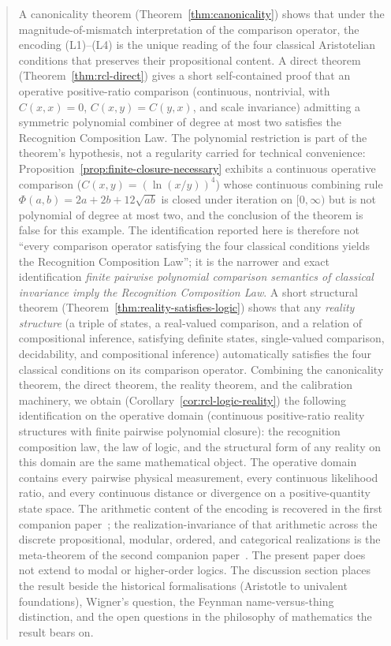 \documentclass[11pt,a4paper]{article}
\theoremstyle{definition}
\theoremstyle{remark}
\begin{document}
\begin{abstract}
A canonicality theorem (Theorem~\ref{thm:canonicality}) shows that
under the magnitude-of-mismatch interpretation of the comparison
operator, the encoding (L1)--(L4) is the unique reading of the four
classical Aristotelian conditions that preserves their propositional
content. A direct theorem
(Theorem~\ref{thm:rcl-direct}) gives a short self-contained proof
that an operative positive-ratio comparison (continuous, nontrivial,
with $C(x,x) = 0$, $C(x,y) = C(y,x)$, and scale invariance) admitting
a symmetric polynomial combiner of degree at most two satisfies the
Recognition Composition Law. The polynomial restriction is part of
the theorem's hypothesis, not a regularity carried for technical
convenience: Proposition~\ref{prop:finite-closure-necessary} exhibits
a continuous operative comparison ($C(x,y) = (\ln(x/y))^4$) whose
continuous combining rule $\Phi(a, b) = 2a + 2b + 12\sqrt{ab}$ is
closed under iteration on $[0, \infty)$ but is not polynomial of
degree at most two, and the conclusion of the theorem is false for
this example. The identification reported here is therefore not
``every comparison operator satisfying the four classical conditions
yields the Recognition Composition Law''; it is the narrower and
exact identification \emph{finite pairwise polynomial comparison
semantics of classical invariance imply the Recognition Composition
Law}. A short structural theorem
(Theorem~\ref{thm:reality-satisfies-logic}) shows that any
\emph{reality structure} (a triple of states, a real-valued
comparison, and a relation of compositional inference, satisfying
definite states, single-valued comparison, decidability, and
compositional inference) automatically satisfies the four classical
conditions on its comparison operator. Combining the canonicality
theorem, the direct theorem, the reality theorem, and the calibration
machinery, we obtain
(Corollary~\ref{cor:rcl-logic-reality}) the following identification
on the operative domain (continuous positive-ratio reality structures
with finite pairwise polynomial closure): the recognition composition
law, the law of logic, and the structural form of any reality on this
domain are the same mathematical object. The operative domain
contains every pairwise physical measurement, every continuous
likelihood ratio, and every continuous distance or divergence on a
positive-quantity state space. The arithmetic content of the encoding
is recovered in the first companion
paper~\cite{Washburn2026Arithmetic}; the realization-invariance of
that arithmetic across the discrete propositional, modular, ordered,
and categorical realizations is the meta-theorem of the second
companion paper~\cite{Washburn2026UniversalForcing}. The present
paper does not extend to modal or higher-order logics. The discussion
section places the result beside the historical formalisations
(Aristotle to univalent foundations), Wigner's question, the Feynman
name-versus-thing distinction, and the open questions in the
philosophy of mathematics the result bears on.
\end{abstract}
\end{document}
